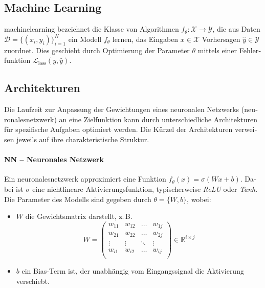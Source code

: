 \begin{otherlanguage}{ngerman}
\section{Machine Learning}

\gls{machinelearning} bezeichnet die Klasse von Algorithmen \( f_{\theta} : \mathcal{X} \rightarrow \mathcal{Y} \), die aus Daten \( \mathcal{D} = \{ (x_i, y_i) \}_{i=1}^{N} \) ein Modell \( f_{\theta} \) lernen, das Eingaben \( x \in \mathcal{X} \) Vorhersagen \( \hat{y} \in \mathcal{Y} \) zuordnet. Dies geschieht durch Optimierung der Parameter \( \theta \) mittels einer Fehlerfunktion \( \mathcal{L}_{\text{loss}}(y, \hat{y}) \).

\subsection{Architekturen}

Die Laufzeit zur Anpassung der Gewichtungen eines neuronalen Netzwerks (\gls{neuronalesnetzwerk}) an eine Zielfunktion kann durch unterschiedliche Architekturen für spezifische Aufgaben optimiert werden. Die Kürzel der Architekturen verweisen jeweils auf ihre charakteristische Struktur.

\paragraph{NN – Neuronales Netzwerk}
Ein \gls{neuronalesnetzwerk} approximiert eine Funktion \( f_{\theta}(x) = \sigma(Wx + b) \). Dabei ist \( \sigma \) eine nichtlineare Aktivierungsfunktion, typischerweise \textit{ReLU} oder \textit{Tanh}. Die Parameter des Modells sind gegeben durch \( \theta = \{ W, b \} \), wobei:

\begin{itemize}
  \item \( W \) die Gewichtsmatrix darstellt, z.\,B. 
    \[
      W = 
      \begin{pmatrix}
        w_{11} & w_{12} & \dots  & w_{1j} \\
        w_{21} & w_{22} & \dots  & w_{2j} \\
        \vdots & \vdots & \ddots & \vdots \\
        w_{i1} & w_{i2} & \dots  & w_{ij} \\
      \end{pmatrix}
      \in \mathbb{R}^{i \times j}
    \]
  \item \( b \) ein Bias-Term ist, der unabhängig vom Eingangssignal die Aktivierung verschiebt.
\end{itemize}


\end{otherlanguage}

